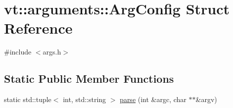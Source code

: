 \hypertarget{structvt_1_1arguments_1_1_arg_config}{}\section{vt\+:\+:arguments\+:\+:Arg\+Config Struct Reference}
\label{structvt_1_1arguments_1_1_arg_config}


{\ttfamily \#include $<$args.\+h$>$}

\subsection*{Static Public Member Functions}
\begin{DoxyCompactItemize}
\item 
static std\+::tuple$<$ int, std\+::string $>$ \hyperlink{structvt_1_1arguments_1_1_arg_config_a03db534c8fd127f38570a49425b6afbd}{parse} (int \&argc, char $\ast$$\ast$\&argv)
\end{DoxyCompactItemize}
